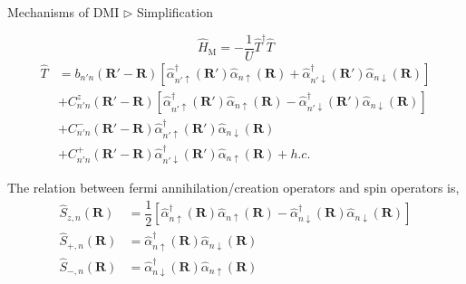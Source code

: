 \documentclass{beamer}
\begin{document}
  \begin{frame}{Mechanisms of DMI \(\rhd\) Simplification}
    \begin{block}{}
      \begin{equation*}
        \widehat{H}_{\text{M}} = -\frac{1}{U}\widehat{T}^\dagger\widehat{T}
      \end{equation*}
      \begin{equation}
        \begin{aligned}
          \widehat{T} &= b_{n'n}(\bm{R}'-\bm{R})\left[\widehat{\alpha}_{n'\uparrow}^{\dagger}(\bm{R}')\widehat{\alpha}_{n\uparrow}(\bm{R}) + \widehat{\alpha}_{n'\downarrow}^{\dagger}(\bm{R}')\widehat{\alpha}_{n\downarrow}(\bm{R})\right]\\
          &+ C_{n'n}^{z}(\bm{R}'-\bm{R})\left[\widehat{\alpha}_{n'\uparrow}^{\dagger}(\bm{R}')\widehat{\alpha}_{n\uparrow}(\bm{R}) - \widehat{\alpha}_{n'\downarrow}^{\dagger}(\bm{R}')\widehat{\alpha}_{n\downarrow}(\bm{R})\right]\\
          &+ C_{n'n}^{-}(\bm{R}'-\bm{R})\widehat{\alpha}_{n'\uparrow}^{\dagger}(\bm{R}')\widehat{\alpha}_{n\downarrow}(\bm{R})\\
          &+ C_{n'n}^{+}(\bm{R}'-\bm{R})\widehat{\alpha}_{n'\downarrow}^{\dagger}(\bm{R}')\widehat{\alpha}_{n\uparrow}(\bm{R}) + h.c.
        \end{aligned}
      \end{equation}
    \end{block}
    The relation between fermi annihilation/creation
    operators and spin operators is, 
    \begin{subequations}
      \begin{align}
        \widehat{S}_{z,n}(\bm{R}) &= \dfrac{1}{2}\left[\widehat{\alpha}_{n\uparrow}^\dagger(\bm{R})\widehat{\alpha}_{n\uparrow}(\bm{R}) - \widehat{\alpha}_{n\downarrow}^\dagger(\bm{R})\widehat{\alpha}_{n\downarrow}(\bm{R})\right]\\
        \widehat{S}_{+,n}(\bm{R}) &= \widehat{\alpha}_{n\uparrow}^\dagger(\bm{R})\widehat{\alpha}_{n\downarrow}(\bm{R})\\
        \widehat{S}_{-,n}(\bm{R}) &= \widehat{\alpha}_{n\downarrow}^\dagger(\bm{R})\widehat{\alpha}_{n\uparrow}(\bm{R})
      \end{align}
    \end{subequations}
  \end{frame}
\end{document}
